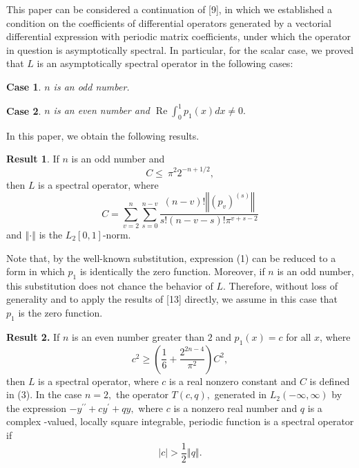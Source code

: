 \documentclass{article}%
\newtheorem{case}{Case}
\begin{document}
This paper can be considered a continuation of [9], in which we established a
condition on the coefficients of differential operators generated by a
vectorial differential expression with periodic matrix coefficients, under
which the operator in question is asymptotically spectral. In particular, for
the scalar case, we proved that $L$ is an asymptotically spectral operator in
the following cases:

\begin{case}
$n$ is an odd number.
\end{case}

\begin{case}
$n$ is an even number and $\operatorname{Re}\int_{0}^{1}p_{1}(x)dx\neq0.$
\end{case}

In this paper, we obtain the following results.

\textbf{Result 1}. If $n$ is an odd number and
\begin{equation}
C\leq\ \pi^{2}2^{-n+1/2}, \tag{3}%
\end{equation}
then $L$ is a spectral operator, where
\[
C=%
{\textstyle\sum\limits_{v=2}^{n}}
{\textstyle\sum\limits_{s=0}^{n-v}}
\frac{\left(  n-v\right)  !\left\Vert \left(  p_{v}\right)  ^{(s)}\right\Vert
}{s!(n-v-s)!\pi^{v+s-2}}%
\]
and $\left\Vert \cdot\right\Vert $ is the $L_{2}\left[  0,1\right]  $-norm.

Note that, by the well-known substitution, expression (1) can be reduced to a
form in which $p_{1}$ is identically the zero function. Moreover, if $n$ is an
odd number, this substitution does not chance the behavior of $L.$ Therefore,
without loss of generality and to apply the results of [13] directly, we
assume in this case that \ $p_{1}$ is the zero function.

\textbf{Result 2. }If $n$ is an even number greater than $2$ and $p_{1}(x)=c$
for all $x$, where
\begin{equation}
c^{2}\geq\left(  \frac{1}{6}+\frac{2^{2n-4}}{\pi^{2}}\right)  C^{2}, \tag{4}%
\end{equation}
then $L$ is a spectral operator, where $c$ is a real nonzero constant and $C$
is defined in (3). In the case $n=2,$ the operator $T(c,q),$ generated in
$L_{2}(-\infty,\infty)$ by the expression $-y^{\prime\prime}+cy^{\prime}+qy,$
where $c$ is a nonzero real number and $q$ is a complex -valued, locally
square integrable, periodic function is a spectral operator if
\begin{equation}
\left\vert c\right\vert >\frac{1}{2}\left\Vert q\right\Vert . \tag{5}%
\end{equation}
\end{document}

